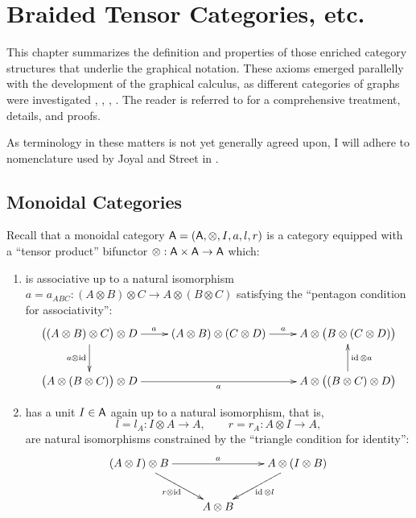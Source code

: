 

\chapter{Braided Tensor Categories, etc.}
\label{cha:btc}

This chapter summarizes the definition and properties of those
enriched category structures that underlie the graphical notation.
These axioms emerged parallelly with the development of the graphical
calculus, as different categories of graphs were investigated
\cite{turaev;yang-baxter}, \cite{freyd-yetter;btc},
\cite{joyal-street;tensor-calculus}, \cite{shum;tortile-categories}.
The reader is referred to \cite{joyal-street;btc} for a comprehensive
treatment, details, and proofs.

As terminology in these matters is not yet generally agreed upon, I
will adhere to nomenclature used by Joyal and Street in
\cite{joyal-street;tensor-calculus, joyal-street;btc}. 


\section{Monoidal Categories}
\label{sec:monoidal-categories}

Recall that a monoidal category $\mathsf{A} = (\mathsf{A}, \otimes, I, a, l, r)$ is a
category equipped with a ``tensor product'' bifunctor $\otimes: \mathsf{A} \times \mathsf{A} \to
\mathsf{A}$ which:
\begin{enumerate}
\item is associative up to a natural isomorphism $a = a_{ABC}:
  (A\otimes B)\otimes C \to A\otimes(B\otimes C)$ satisfying the ``pentagon condition for
  associativity'': 
  \begin{equation*}
    \xymatrix{%
      \bigl((A\otimes B)\otimes C\bigr)\otimes D
      &
      (A\otimes B) \otimes (C\otimes D)
      &
      A \otimes \bigl(B\otimes(C\otimes D)\bigr)
      \\
      \bigl(A\otimes(B\otimes C)\bigr) \otimes D
      &
      &
      A\otimes\bigl((B\otimes C)\otimes D\bigr)
      \ar "1,1";"1,2"^{a}
      \ar "1,2";"1,3"^{a}
      \ar "1,1";"2,1"_{a \otimes \id}
      \ar "2,1";"2,3"_{a}
      \ar "2,3";"1,3"_{\id \otimes a}
      }
  \end{equation*}
\item has a unit $I \in \mathsf{A}$ again up to a natural isomorphism, that is,
  \begin{equation*}
    l = l_A: I \otimes A \to A, \qquad r = r_A: A \otimes I \to A,
  \end{equation*}
  are natural isomorphisms constrained by the ``triangle condition for
  identity'':
  \begin{equation*}
    \xymatrix{%
      (A \otimes I) \otimes B
      &
      &
      A \otimes (I \otimes B)
      \\
      &
      A \otimes B
      &
      \ar "1,1";"1,3"^{a}
      \ar "1,1";"2,2"_{r \otimes \id}
      \ar "1,3";"2,2"^{\id \otimes l}
      }
  \end{equation*}
\end{enumerate}

